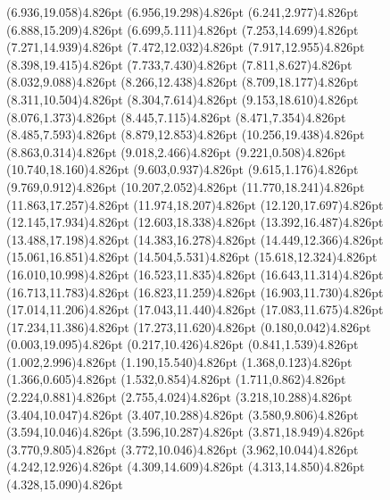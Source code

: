 \documentclass[10pt]{article}
\begin{document}
{{\qdisk(6.936,19.058){4.826pt}%
\qdisk(6.956,19.298){4.826pt}%
\qdisk(6.241,2.977){4.826pt}%
\qdisk(6.888,15.209){4.826pt}%
\qdisk(6.699,5.111){4.826pt}%
\qdisk(7.253,14.699){4.826pt}%
\qdisk(7.271,14.939){4.826pt}%
\qdisk(7.472,12.032){4.826pt}%
\qdisk(7.917,12.955){4.826pt}%
\qdisk(8.398,19.415){4.826pt}%
\qdisk(7.733,7.430){4.826pt}%
\qdisk(7.811,8.627){4.826pt}%
\qdisk(8.032,9.088){4.826pt}%
\qdisk(8.266,12.438){4.826pt}%
\qdisk(8.709,18.177){4.826pt}%
\qdisk(8.311,10.504){4.826pt}%
\qdisk(8.304,7.614){4.826pt}%
\qdisk(9.153,18.610){4.826pt}%
\qdisk(8.076,1.373){4.826pt}%
\qdisk(8.445,7.115){4.826pt}%
\qdisk(8.471,7.354){4.826pt}%
\qdisk(8.485,7.593){4.826pt}%
\qdisk(8.879,12.853){4.826pt}%
\qdisk(10.256,19.438){4.826pt}%
\qdisk(8.863,0.314){4.826pt}%
\qdisk(9.018,2.466){4.826pt}%
\qdisk(9.221,0.508){4.826pt}%
\qdisk(10.740,18.160){4.826pt}%
\qdisk(9.603,0.937){4.826pt}%
\qdisk(9.615,1.176){4.826pt}%
\qdisk(9.769,0.912){4.826pt}%
\qdisk(10.207,2.052){4.826pt}%
\qdisk(11.770,18.241){4.826pt}%
\qdisk(11.863,17.257){4.826pt}%
\qdisk(11.974,18.207){4.826pt}%
\qdisk(12.120,17.697){4.826pt}%
\qdisk(12.145,17.934){4.826pt}%
\qdisk(12.603,18.338){4.826pt}%
\qdisk(13.392,16.487){4.826pt}%
\qdisk(13.488,17.198){4.826pt}%
\qdisk(14.383,16.278){4.826pt}%
\qdisk(14.449,12.366){4.826pt}%
\qdisk(15.061,16.851){4.826pt}%
\qdisk(14.504,5.531){4.826pt}%
\qdisk(15.618,12.324){4.826pt}%
\qdisk(16.010,10.998){4.826pt}%
\qdisk(16.523,11.835){4.826pt}%
\qdisk(16.643,11.314){4.826pt}%
\qdisk(16.713,11.783){4.826pt}%
\qdisk(16.823,11.259){4.826pt}%
\qdisk(16.903,11.730){4.826pt}%
\qdisk(17.014,11.206){4.826pt}%
\qdisk(17.043,11.440){4.826pt}%
\qdisk(17.083,11.675){4.826pt}%
\qdisk(17.234,11.386){4.826pt}%
\qdisk(17.273,11.620){4.826pt}%
\dummycolor
\qdisk(0.180,0.042){4.826pt}%
\qdisk(0.003,19.095){4.826pt}%
\qdisk(0.217,10.426){4.826pt}%
\qdisk(0.841,1.539){4.826pt}%
\qdisk(1.002,2.996){4.826pt}%
\qdisk(1.190,15.540){4.826pt}%
\qdisk(1.368,0.123){4.826pt}%
\qdisk(1.366,0.605){4.826pt}%
\qdisk(1.532,0.854){4.826pt}%
\qdisk(1.711,0.862){4.826pt}%
\qdisk(2.224,0.881){4.826pt}%
\qdisk(2.755,4.024){4.826pt}%
\qdisk(3.218,10.288){4.826pt}%
\qdisk(3.404,10.047){4.826pt}%
\qdisk(3.407,10.288){4.826pt}%
\qdisk(3.580,9.806){4.826pt}%
\qdisk(3.594,10.046){4.826pt}%
\qdisk(3.596,10.287){4.826pt}%
\qdisk(3.871,18.949){4.826pt}%
\qdisk(3.770,9.805){4.826pt}%
\qdisk(3.772,10.046){4.826pt}%
\qdisk(3.962,10.044){4.826pt}%
\qdisk(4.242,12.926){4.826pt}%
\qdisk(4.309,14.609){4.826pt}%
\qdisk(4.313,14.850){4.826pt}%
\qdisk(4.328,15.090){4.826pt}%
}}
\end{document}
